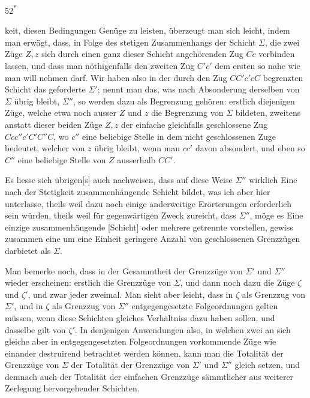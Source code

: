 \par\vfill\hfill{\small 52\textsuperscript{*}}\par
\clearpage{}
\noindent keit, diesen Bedingungen Genüge zu leisten, überzeugt man sich leicht, indem man erwägt, dass, in Folge des stetigen Zusammenhangs der Schicht \(\Sigma\), die zwei Züge \(Z,z\) sich durch einen ganz dieser Schicht angehörenden Zug \(Cc\) verbinden lassen, und dass man nöthigenfalls den zweiten Zug \(C'c'\) dem ersten so nahe wie man will nehmen darf. Wir haben also in der durch den Zug \(CC'c'cC\) begrenzten Schicht das geforderte \(\Sigma'\); nennt man das, was nach Absonderung derselben von \(\Sigma\) übrig bleibt, \(\Sigma''\), so werden dazu als Begrenzung gehören: erstlich diejenigen Züge, welche etwa noch ausser \(Z\) und \(z\) die Begrenzung von \(\Sigma\) bildeten, zweitens anstatt dieser beiden Züge \(Z,z\) der einfache gleichfalls geschlossene Zug \(Ccc''c'C'C''C\), wo \(c''\) eine beliebige Stelle in dem nicht geschlossenen Zuge bedeutet, welcher von \(z\) übrig bleibt, wenn man \(cc'\) davon absondert, und eben so \(C''\) eine beliebige Stelle von \(Z\) ausserhalb \(CC'\).

Es liesse sich übrigen[s] auch nachweisen, dass auf diese Weise \(\Sigma''\) wirklich Eine nach der Stetigkeit zusammenhängende Schicht bildet, was ich aber hier unterlasse, theils weil dazu noch einige anderweitige Erörterungen erforderlich sein würden, theils weil für gegenwärtigen Zweck zureicht, dass \(\Sigma''\), möge es Eine einzige zusammenhängende [Schicht] oder mehrere getrennte vorstellen, gewiss zusammen eine um eine Einheit geringere Anzahl von geschlossenen Grenzzügen darbietet als \(\Sigma\).

Man bemerke noch, dass in der Gesammtheit der Grenzzüge von \(\Sigma'\) und \(\Sigma''\) wieder erscheinen: erstlich die Grenzzüge von \(\Sigma\), und dann noch dazu die Züge \(\zeta\) und \(\zeta'\), und zwar jeder zweimal. Man sieht aber leicht, dass in \(\zeta\) als Grenzzug von \(\Sigma'\), und in \(\zeta\) als Grenzzug von \(\Sigma''\) entgegengesetzte Folgeordnungen gelten müssen, wenn diese Schichten gleiches Verhältniss dazu haben sollen, und dasselbe gilt von \(\zeta'\). In denjenigen Anwendungen also, in welchen zwei an sich gleiche aber in entgegengesetzten Folgeordnungen vorkommende Züge wie einander destruirend betrachtet werden können, kann man die Totalität der Grenzzüge von \(\Sigma\) der Totalität der Grenzzüge von \(\Sigma'\) und \(\Sigma''\) gleich setzen, und demnach auch der Totalität der einfachen Grenzzüge sämmtlicher aus weiterer Zerlegung hervorgehender Schichten.
